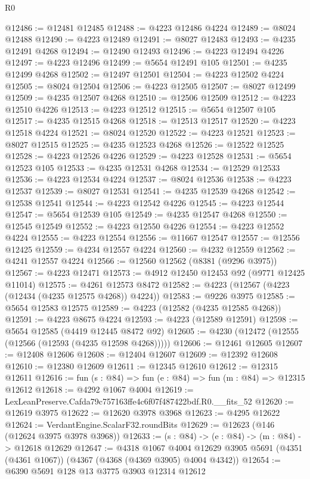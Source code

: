 \begin{lexlean}{R0}
\begin{coremodule}
@12486 := @12481 @12485
@12488 := @4223 @12486 @4224
@12489 := @8024 @12488
@12490 := @4223 @12489
@12491 := @8027 @12483
@12493 := @4235 @12491 @4268
@12494 := @12490 @12493
@12496 := @4223 @12494 @4226
@12497 := @4223 @12496
@12499 := @5654 @12491 @105
@12501 := @4235 @12499 @4268
@12502 := @12497 @12501
@12504 := @4223 @12502 @4224
@12505 := @8024 @12504
@12506 := @4223 @12505
@12507 := @8027 @12499
@12509 := @4235 @12507 @4268
@12510 := @12506 @12509
@12512 := @4223 @12510 @4226
@12513 := @4223 @12512
@12515 := @5654 @12507 @105
@12517 := @4235 @12515 @4268
@12518 := @12513 @12517
@12520 := @4223 @12518 @4224
@12521 := @8024 @12520
@12522 := @4223 @12521
@12523 := @8027 @12515
@12525 := @4235 @12523 @4268
@12526 := @12522 @12525
@12528 := @4223 @12526 @4226
@12529 := @4223 @12528
@12531 := @5654 @12523 @105
@12533 := @4235 @12531 @4268
@12534 := @12529 @12533
@12536 := @4223 @12534 @4224
@12537 := @8024 @12536
@12538 := @4223 @12537
@12539 := @8027 @12531
@12541 := @4235 @12539 @4268
@12542 := @12538 @12541
@12544 := @4223 @12542 @4226
@12545 := @4223 @12544
@12547 := @5654 @12539 @105
@12549 := @4235 @12547 @4268
@12550 := @12545 @12549
@12552 := @4223 @12550 @4226
@12554 := @4223 @12552 @4224
@12555 := @4223 @12554
@12556 := @11667 @12547
@12557 := @12556 @12425
@12559 := @4234 @12557 @4224
@12560 := @4232 @12559
@12562 := @4241 @12557 @4224
@12566 := @12560 @12562 (@8381 (@9296 @3975))
@12567 := @4223 @12471
@12573 := @4912 @12450 @12453 @92 (@9771 @12425 @11014)
@12575 := @4261 @12573 @8472
@12582 := @4223 (@12567 (@4223 (@12434 (@4235 @12575 @4268)) @4224))
@12583 := @9226 @3975
@12585 := @5654 @12583 @12575
@12589 := @4223 (@12582 (@4235 @12585 @4268))
@12591 := @4223 @8675 @4224
@12593 := @4223 (@12589 @12591)
@12598 := @5654 @12585 (@4419 @12445 @8472 @92)
@12605 := @4230 (@12472 (@12555 (@12566 (@12593 (@4235 @12598 @4268)))))
@12606 := @12461 @12605
@12607 := @12408 @12606
@12608 := @12404 @12607
@12609 := @12392 @12608
@12610 := @12380 @12609
@12611 := @12345 @12610
@12612 := @12315 @12611
@12616 := fun (s : @84) => fun (e : @84) => fun (m : @84) => @12315 @12612
@12618 := @4292 @1067 @4004
@12619 := LexLeanPreserve.Cafda79c757163ffe4c6f07f487422bdf.R0.__fits_52
@12620 := @12619 @3975
@12622 := @12620 @3978 @3968
@12623 := @4295 @12622
@12624 := VerdantEngine.ScalarF32.roundBits
@12629 := @12623 (@146 (@12624 @3975 @3978 @3968))
@12633 := (s : @84) -> (e : @84) -> (m : @84) -> @12618 @12629
@12647 := @4318
    @1067
    @4004
    @12629
    @3905
    @5691
    (@4351 (@4361 @1067))
    (@4367 (@4368 (@4369 @3905) @4004 @4342))
@12654 := @6390 @5691 @128 @13 @3775 @3903 @12314 @12612

\end{coremodule}
\end{lexlean}
